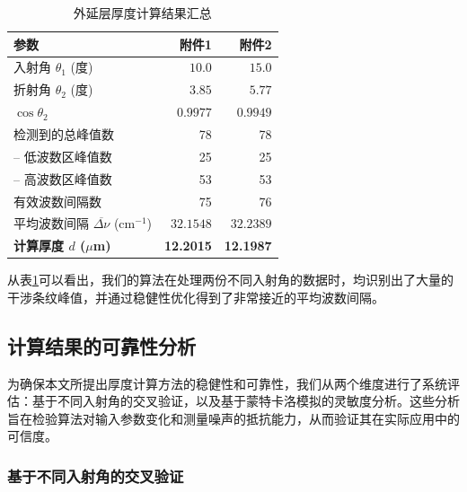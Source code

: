 \documentclass{ctexart} %
\begin{document}
\begin{table}[htbp]
    \centering
    \caption{外延层厚度计算结果汇总}
    \label{tab:results_q2}
    \begin{tabular}{lrr}
        \toprule
        \textbf{参数}                               & \textbf{附件1}     & \textbf{附件2}     \\
        \midrule
        入射角 $\theta_1$ (度)                        & $10.0$           & $15.0$           \\
        折射角 $\theta_2$ (度)                        & $3.85$           & $5.77$           \\
        $\cos\theta_2$                            & $0.9977$         & $0.9949$         \\
        检测到的总峰值数                                  & 78               & 78               \\
        \quad -- 低波数区峰值数                          & 25               & 25               \\
        \quad -- 高波数区峰值数                          & 53               & 53               \\
        有效波数间隔数                                   & 75               & 76               \\
        平均波数间隔 $\overline{\Delta\nu}$ (cm$^{-1}$) & $32.1548$        & $32.2389$        \\
        \textbf{计算厚度 $d$ ($\mu$m)}                & \textbf{12.2015} & \textbf{12.1987} \\
        \bottomrule
    \end{tabular}
\end{table}

从表\ref{tab:results_q2}可以看出，我们的算法在处理两份不同入射角的数据时，均识别出了大量的干涉条纹峰值，并通过稳健性优化得到了非常接近的平均波数间隔。


\subsection{计算结果的可靠性分析}

为确保本文所提出厚度计算方法的稳健性和可靠性，我们从两个维度进行了系统评估：基于不同入射角的交叉验证，以及基于蒙特卡洛模拟的灵敏度分析。这些分析旨在检验算法对输入参数变化和测量噪声的抵抗能力，从而验证其在实际应用中的可信度。

\subsubsection{基于不同入射角的交叉验证}
\end{document}

